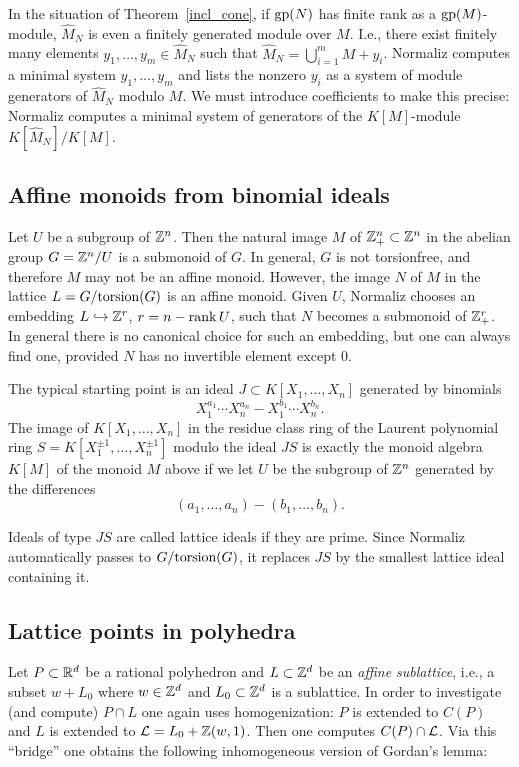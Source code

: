 In the situation of Theorem~\ref{incl_cone}, if $\operatorname{gp}(N)$ has finite rank as a $\operatorname{gp}(M)$-module, $\widehat M_N$ is even a finitely generated module over $M$. I.e., there exist finitely many elements $y_1,\dots,y_m\in \widehat M_N$ such that $\widehat M_N=\bigcup_{i=1}^m M+y_i$. Normaliz computes a minimal system $y_1,\dots,y_m$ and lists the nonzero $y_i$ as a system of module generators of $\widehat M_N$ modulo $M$. We must introduce coefficients to make this precise: Normaliz computes a minimal system of generators of the $K[M]$-module $K[\widehat M_N]/K[M]$.

\subsection{Affine monoids from binomial ideals}\label{binomials}

Let $U$ be a subgroup of ${\mathbb Z}^n$. Then the natural image $M$ of
${\mathbb Z}_+^n\subset{\mathbb Z}^n$ in the abelian group $G={\mathbb Z}^n/U$ is a
submonoid of $G$. In general, $G$ is not torsionfree, and
therefore $M$ may not be an affine monoid. However, the image
$N$ of $M$ in the lattice $L=G/\textup{torsion}(G)$ is an affine
monoid. Given $U$, Normaliz chooses an embedding
$L\hookrightarrow{\mathbb Z}^r$, $r=n-\operatorname{rank} U$, such that $N$ becomes a
submonoid of ${\mathbb Z}_+^r$. In general there is no canonical choice
for such an embedding, but one can always find one, provided
$N$ has no invertible element except $0$.

The typical starting point is an ideal $J\subset
K[X_1,\dots,X_n]$ generated by binomials
$$
X_1^{a_1}\cdots X_n^{a_n}-X_1^{b_1}\cdots X_n^{b_n}.
$$
The image of $K[X_1,\dots,X_n]$ in the residue class ring of
the Laurent polynomial ring $S=K[X_1^{\pm1},\dots,X_n^{\pm1}]$
modulo the ideal $JS$ is exactly the monoid algebra $K[M]$ of
the monoid $M$ above if we let $U$ be the subgroup of ${\mathbb Z}^n$
generated by the differences
$$
(a_1,\dots,a_n)-(b_1,\dots,b_n).
$$

Ideals of type $JS$ are called lattice ideals if they are
prime. Since Normaliz automatically passes to
$G/\textup{torsion}(G)$, it replaces $JS$ by the smallest lattice
ideal containing it.

\subsection{Lattice points in polyhedra}\label{latt_hedra}

Let $P\subset {\mathbb R}^d$ be a rational polyhedron and $L\subset {\mathbb Z}^d$ be an \emph{affine sublattice}, i.e., a subset $w+L_0$ where $w\in{\mathbb Z}^d$ and $L_0\subset {\mathbb Z}^d$ is a sublattice. In order to investigate (and compute) $P\cap L$ one again uses homogenization: $P$ is extended to $C(P)$ and $L$ is extended to ${\mathcal L}=L_0+{\mathbb Z}(w,1)$. Then one computes $C(P)\cap {\mathcal L}$. Via this ``bridge'' one obtains the following inhomogeneous version of Gordan's lemma:


